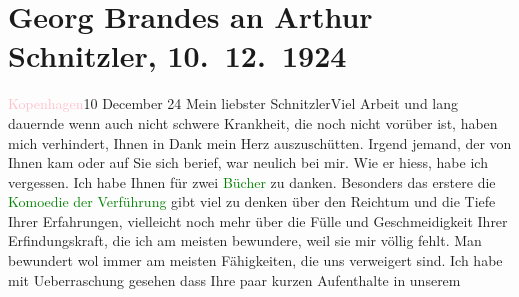 

               \section[Georg Brandes an Arthur Schnitzler, 10. 12. 1924]{ Georg Brandes an Arthur Schnitzler, 10. 12. 1924}\nopagebreak{}\rehead{ }\normalsize\beginnumbering{} \toendnotes[C]{\smallbreak\pagebreak[2]} 
\toendnotes[C]{\smallbreak}\pstart
           \raggedleft{}{\pb}\textcolor{pink}{Kopenhagen}{}\ledrightnote{\textcolor{pink}{Kopenhagen}}{ }10 December 24\pend
           \pstart
           Mein liebster Schnitzler\hspace*{3.5em}Viel Arbeit und lang dauernde wenn auch nicht
                    schwere Krankheit, die noch nicht vorüber ist, haben mich verhindert, Ihnen in
                    Dank mein Herz auszuschütten. Irgend jemand, der von Ihnen kam oder auf Sie sich
                    berief, war neulich bei mir. Wie er hiess, habe ich vergessen.\pend
           \pstart
           Ich habe Ihnen für zwei \textcolor{green}{Bücher}{} zu danken. Besonders das erstere die \textcolor{green}{Komoedie der Verführung}{}\ledrightnote{\textcolor{green}{Komödie der Verführung. In drei Akten}} gibt viel zu denken über den
                    Reichtum und die Tiefe Ihrer Erfahrungen, vielleicht noch mehr über die Fülle
                    und Geschmeidigkeit Ihrer Erfindungskraft, die ich am meisten bewundere, weil
                    sie mir völlig fehlt. Man bewundert {\pb}wol immer am meisten
                    Fähigkeiten, die uns verweigert sind.\pend
           \pstart
           Ich habe mit Ueberraschung gesehen dass Ihre paar kurzen Aufenthalte in unserem
